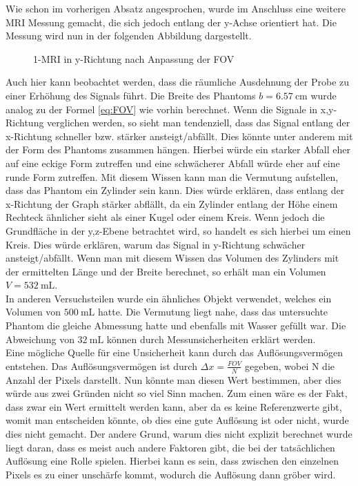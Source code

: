 Wie schon im vorherigen Absatz angesprochen, wurde im Anschluss eine weitere MRI Messung gemacht, die sich jedoch entlang der y-Achse orientiert hat. Die Messung wird nun in der folgenden Abbildung dargestellt.
\begin{figure}[H]
    \centering
    
    \caption{1-MRI in y-Richtung nach Anpassung der FOV}\label{fig:1Dy}
\end{figure} 
Auch hier kann beobachtet werden, dass die räumliche Ausdehnung der Probe zu einer Erhöhung des Signals führt. Die Breite des Phantoms $b=\SI{6,57}{\centi \m}$ wurde analog zu der Formel \ref{eq:FOV} wie vorhin berechnet. Wenn die Signale in x,y-Richtung verglichen werden, so sieht man tendenziell, dass das Signal entlang der x-Richtung schneller bzw. stärker ansteigt/abfällt. Dies könnte unter anderem mit der Form des Phantoms zusammen hängen. Hierbei würde ein starker Abfall eher auf eine eckige Form zutreffen und eine schwächerer Abfall würde eher auf eine runde Form zutreffen. Mit diesem Wissen kann man die Vermutung aufstellen, dass das Phantom ein Zylinder sein kann. Dies würde erklären, dass entlang der x-Richtung der Graph stärker abflällt, da ein Zylinder entlang der Höhe einem Rechteck ähnlicher sieht als einer Kugel oder einem Kreis. Wenn jedoch die Grundfläche in der y,z-Ebene betrachtet wird, so handelt es sich hierbei um einen Kreis. Dies würde erklären, warum das Signal in y-Richtung schwächer ansteigt/abfällt. Wenn man mit diesem Wissen das Volumen des Zylinders mit der ermittelten Länge und der Breite berechnet, so erhält man ein Volumen $V=\SI{532}{\milli\liter}$.\\
In anderen Versuchsteilen wurde ein ähnliches Objekt verwendet, welches ein Volumen von $\SI{500}{\milli \liter}$ hatte. Die Vermutung liegt nahe, dass das untersuchte Phantom die gleiche Abmessung hatte und ebenfalls mit Wasser gefüllt war. Die Abweichung von $\SI{32}{\milli\liter}$ können durch Messunsicherheiten erklärt werden.\\
Eine mögliche Quelle für eine Unsicherheit kann durch das Auflösungsvermögen entstehen. Das Auflösungsvermögen ist durch $\Delta x=\frac{FOV}{N}$ gegeben, wobei N die Anzahl der Pixels darstellt\cite{Schmidt}. Nun könnte man diesen Wert bestimmen, aber dies würde aus zwei Gründen nicht so viel Sinn machen. Zum einen wäre es der Fakt, dass zwar ein Wert ermittelt werden kann, aber da es keine Referenzwerte gibt, womit man entscheiden könnte, ob dies eine gute Auflösung ist oder nicht, wurde dies nicht gemacht. Der andere Grund, warum dies nicht explizit berechnet wurde liegt daran, dass es meist auch andere Faktoren gibt, die bei der tatsächlichen Auflösung eine Rolle spielen. Hierbei kann es sein, dass zwischen den einzelnen Pixels es zu einer unschärfe kommt, wodurch die Auflösung dann gröber wird.\\

